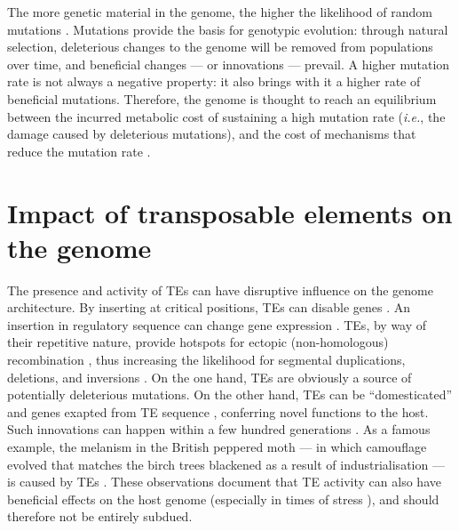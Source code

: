 The more genetic material in the genome, the higher the likelihood of
random mutations \citep{Wielgoss2011}.  Mutations provide the basis for
genotypic evolution: through natural selection, deleterious changes to
the genome will be removed from populations over time, and beneficial
changes --- or innovations --- prevail.  A higher mutation rate is not
always a negative property: it also brings with it a higher rate of
beneficial mutations.  Therefore, the genome is thought to reach an
equilibrium between the incurred metabolic cost of sustaining a high
mutation rate (\emph{i.e.}, the damage caused by deleterious mutations),
and the cost of mechanisms that reduce the mutation rate
\citep{Bernstein1987, Altenberg2011}.

\section{Impact of transposable elements on the genome}

The presence and activity of TEs can have disruptive influence on the
genome architecture.  By inserting at critical positions, TEs can disable
genes \citep{Kazazian1988}.  An insertion in regulatory sequence can
change gene expression \citep{Warnefors2010}.  TEs, by way of their
repetitive nature, provide hotspots for ectopic (non-homologous)
recombination \citep{Lim1988, Gray2000, Fiston-Lavier2007}, thus
increasing the likelihood for segmental duplications, deletions, and
inversions \citep{Mathiopoulos1998, Remnant2013}.  On the one hand, TEs
are obviously a source of potentially deleterious mutations.  On the
other hand, TEs can be ``domesticated'' and genes exapted from TE
sequence \citep{Gahan2001, Daborn2002, Aminetzach2005, Chen2007},
conferring novel functions to the host.  Such innovations can happen
within a few hundred generations \citep{Dolgin2006, Struchiner2009,
Kofler2015}.  As a famous example, the melanism in the British peppered
moth --- in which camouflage evolved that matches the birch trees
blackened as a result of industrialisation --- is caused by TEs
\citep{Hof2016}.  These observations document that TE activity can also
have beneficial effects on the host genome (especially in times of
stress \citep{Chenais2012}), and should therefore not be entirely
subdued.

